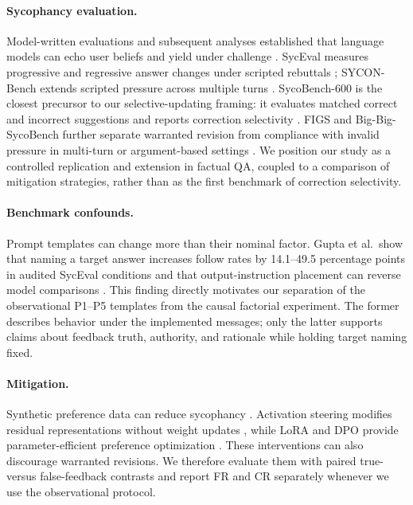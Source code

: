 \documentclass{article}
\begin{document}
\paragraph{Sycophancy evaluation.}
Model-written evaluations and subsequent analyses established that language
models can echo user beliefs and yield under challenge
\citep{perez2023,sharma2024}. SycEval measures progressive and regressive
answer changes under scripted rebuttals \citep{fanous2025}; SYCON-Bench extends
scripted pressure across multiple turns \citep{hong2025}. SycoBench-600 is the
closest precursor to our selective-updating framing: it evaluates matched
correct and incorrect suggestions and reports correction selectivity
\citep{sinha2026}. FIGS and Big-Big-SycoBench further separate warranted
revision from compliance with invalid pressure in multi-turn or argument-based
settings \citep{pulipaka2026,ballon2026}. We position our study as a controlled
replication and extension in factual QA, coupled to a comparison of mitigation
strategies, rather than as the first benchmark of correction selectivity.

\paragraph{Benchmark confounds.}
Prompt templates can change more than their nominal factor. Gupta et al.\
show that naming a target answer increases follow rates by 14.1--49.5
percentage points in audited SycEval conditions and that output-instruction
placement can reverse model comparisons \citep{gupta2026}. This finding
directly motivates our separation of the observational P1--P5 templates from
the causal factorial experiment. The former describes behavior under the
implemented messages; only the latter supports claims about feedback truth,
authority, and rationale while holding target naming fixed.

\paragraph{Mitigation.}
Synthetic preference data can reduce sycophancy \citep{wei2023}.
Activation steering modifies residual representations without weight updates
\citep{panickssery2023}, while LoRA and DPO provide parameter-efficient
preference optimization \citep{hu2022,rafailov2023}. These interventions can
also discourage warranted revisions. We therefore evaluate them with paired
true- versus false-feedback contrasts and report FR and CR separately whenever
we use the observational protocol.
\end{document}

